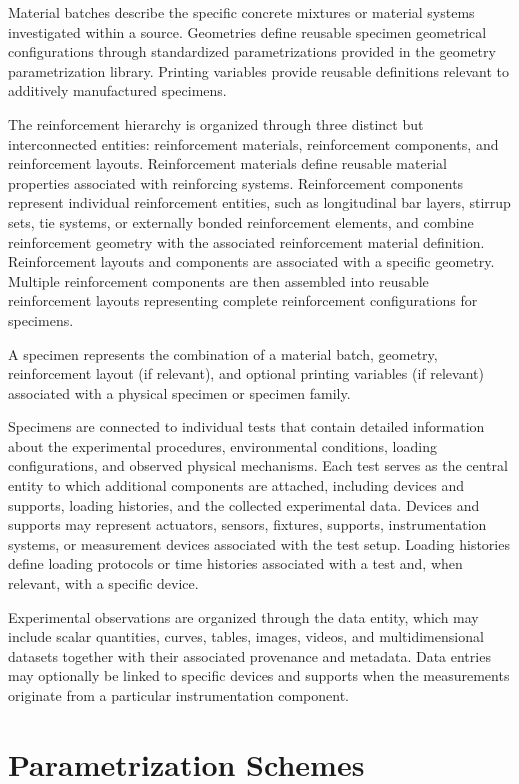 \documentclass[11pt]{book}
\begin{document}
Material batches describe the specific concrete mixtures or material systems investigated within a source. Geometries define reusable specimen geometrical configurations through standardized parametrizations provided in the geometry parametrization library. Printing variables provide reusable definitions relevant to additively manufactured specimens.

The reinforcement hierarchy is organized through three distinct but interconnected entities: reinforcement materials, reinforcement components, and reinforcement layouts. Reinforcement materials define reusable material properties associated with reinforcing systems. Reinforcement components represent individual reinforcement entities, such as longitudinal bar layers, stirrup sets, tie systems, or externally bonded reinforcement elements, and combine reinforcement geometry with the associated reinforcement material definition. Reinforcement layouts and components are associated with a specific geometry. Multiple reinforcement components are then assembled into reusable reinforcement layouts representing complete reinforcement configurations for specimens.

A specimen represents the combination of a material batch, geometry, reinforcement layout (if relevant), and optional printing variables (if relevant) associated with a physical specimen or specimen family.

Specimens are connected to individual tests that contain detailed information about the experimental procedures, environmental conditions, loading configurations, and observed physical mechanisms. Each test serves as the central entity to which additional components are attached, including devices and supports, loading histories, and the collected experimental data. Devices and supports may represent actuators, sensors, fixtures, supports, instrumentation systems, or measurement devices associated with the test setup. Loading histories define loading protocols or time histories associated with a test and, when relevant, with a specific device.

Experimental observations are organized through the data entity, which may include scalar quantities, curves, tables, images, videos, and multidimensional datasets together with their associated provenance and metadata. Data entries may optionally be linked to specific devices and supports when the measurements originate from a particular instrumentation component.


\section{Parametrization Schemes}
\end{document}
